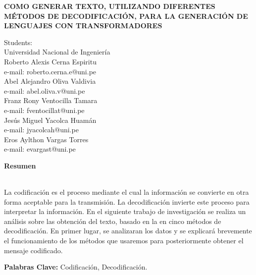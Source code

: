 \documentclass[10pt,twocolumn]{article}
\theoremstyle{definition}
\begin{document}
	
\begin{center}
	\vspace{5pt}
	{\large \textbf{COMO GENERAR TEXTO, UTILIZANDO DIFERENTES MÉTODOS DE DECODIFICACIÓN, PARA LA GENERACIÓN DE LENGUAJES CON TRANSFORMADORES}}\\
\end{center}

\begin{center}
	Students:\\
	\vspace{5pt}
	Universidad Nacional de Ingeniería\\
	\vspace{5pt}
	{\large Roberto Alexis Cerna Espiritu }\\
	e-mail: roberto.cerna.e@uni.pe\\
	{\large Abel Alejandro Oliva Valdivia }\\
	e-mail: abel.oliva.v@uni.pe\\
	{\large Franz Rony Ventocilla Tamara }\\
	e-mail: fventocillat@uni.pe\\
	{\large Jesús Miguel Yacolca Huamán }\\
	e-mail: jyacolcah@uni.pe\\
	{\large Eros Aylthon Vargas Torres }\\
	e-mail: evargast@uni.pe\\
	
\end{center}
\vspace{5pt}
\vspace{20pt}
\begin{abstract*}
{\small
\hspace*{0.5cm}

\begin{center}
    \textbf{Resumen}
\end{center}

\\
La codificación es el proceso mediante el cual la información se convierte en otra forma aceptable para la transmisión. La decodificación invierte este proceso para interpretar la información. En el siguiente trabajo de investigación se realiza un análisis sobre las obtención del texto, basado en la en cinco métodos de decodificación. En primer lugar, se analizaran los datos y se explicará brevemente el funcionamiento de los métodos que usaremos para posteriormente obtener el mensaje codificado.

\textbf{Palabras Clave:} Codificación, Decodificación.
}

\end{abstract*}
\end{document}
